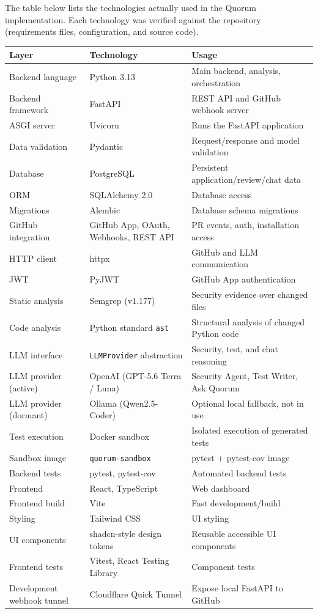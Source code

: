 The table below lists the technologies actually used in the Quorum
implementation. Each technology was verified against the repository
(requirements files, configuration, and source code).

\begin{longtable}{@{}p{3.4cm}p{5.4cm}p{6.6cm}@{}}
\toprule
\textbf{Layer} & \textbf{Technology} & \textbf{Usage} \\
\midrule
\endhead
Backend language & Python 3.13 & Main backend, analysis, orchestration \\
Backend framework & FastAPI & REST API and GitHub webhook server \\
ASGI server & Uvicorn & Runs the FastAPI application \\
Data validation & Pydantic & Request/response and model validation \\
Database & PostgreSQL & Persistent application/review/chat data \\
ORM & SQLAlchemy 2.0 & Database access \\
Migrations & Alembic & Database schema migrations \\
GitHub integration & GitHub App, OAuth, Webhooks, REST API & PR events, auth, installation access \\
HTTP client & httpx & GitHub and LLM communication \\
JWT & PyJWT & GitHub App authentication \\
Static analysis & Semgrep (v1.177) & Security evidence over changed files \\
Code analysis & Python standard \texttt{ast} & Structural analysis of changed Python code \\
LLM interface & \texttt{LLMProvider} abstraction & Security, test, and chat reasoning \\
LLM provider (active) & OpenAI (GPT-5.6 Terra / Luna) & Security Agent, Test Writer, Ask Quorum \\
LLM provider (dormant) & Ollama (Qwen2.5-Coder) & Optional local fallback, not in use \\
Test execution & Docker sandbox & Isolated execution of generated tests \\
Sandbox image & \texttt{quorum-sandbox} & pytest + pytest-cov image \\
Backend tests & pytest, pytest-cov & Automated backend tests \\
Frontend & React, TypeScript & Web dashboard \\
Frontend build & Vite & Fast development/build \\
Styling & Tailwind CSS & UI styling \\
UI components & shadcn-style design tokens & Reusable accessible UI components \\
Frontend tests & Vitest, React Testing Library & Component tests \\
Development webhook tunnel & Cloudflare Quick Tunnel & Expose local FastAPI to GitHub \\
\bottomrule
\end{longtable}

